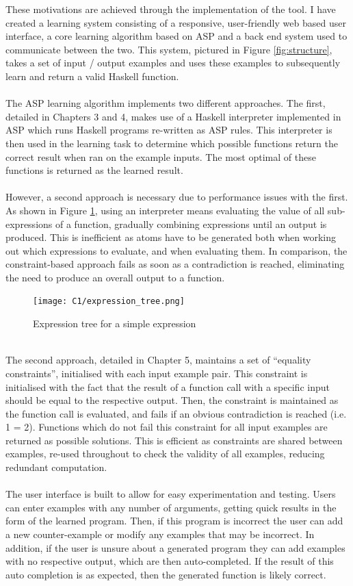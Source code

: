 These motivations are achieved through the implementation of the tool. I have created a learning system consisting of a responsive, user-friendly web based user interface, a core learning algorithm based on ASP and a back end system used to communicate between the two. This system, pictured in Figure \ref{fig:structure}, takes a set of input / output examples and uses these examples to subsequently learn and return a valid Haskell function. \\ \\
The ASP learning algorithm implements two different approaches. The first, detailed in Chapters 3 and 4, makes use of a Haskell interpreter implemented in ASP which runs Haskell programs re-written as ASP rules. This interpreter is then used in the learning task to determine which possible functions return the correct result when ran on the example inputs. The most optimal of these functions is returned as the learned result. \\ \\
However, a second approach is necessary due to performance issues with the first. As shown in Figure \ref{fig:expr_tree}, using an interpreter means evaluating the value of all sub-expressions of a function, gradually combining expressions until an output is produced. This is inefficient as atoms have to be generated both when working out which expressions to evaluate, and when evaluating them. In comparison, the constraint-based approach fails as soon as a contradiction is reached, eliminating the need to produce an overall output to a function.

\begin{figure}[h!]
\centering
\texttt{[image: C1/expression\_tree.png]}
\caption{Expression tree for a simple expression}
\label{fig:expr_tree}
\end{figure}
\mbox{}\\
The second approach, detailed in Chapter 5, maintains a set of ``equality constraints'', initialised with each input example pair. This constraint is initialised with the fact that the result of a function call with a specific input should be equal to the respective output. Then, the constraint is maintained as the function call is evaluated, and fails if an obvious contradiction is reached (i.e. 1 = 2). Functions which do not fail this constraint for all input examples are returned as possible solutions. This is efficient as constraints are shared between examples, re-used throughout to check the validity of all examples, reducing redundant computation. \\ \\
The user interface is built to allow for easy experimentation and testing. Users can enter examples with any number of arguments, getting quick results in the form of the learned program. Then, if this program is incorrect the user can add a new counter-example or modify any examples that may be incorrect. In addition, if the user is unsure about a generated program they can add examples with no respective output, which are then auto-completed. If the result of this auto completion is as expected, then the generated function is likely correct.

